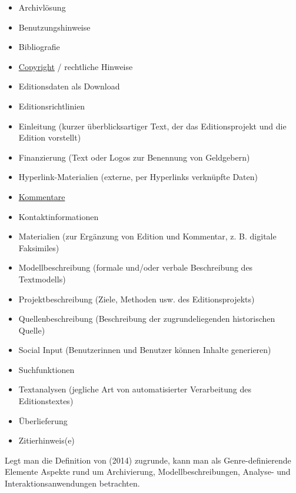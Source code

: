 \documentclass{article}
\begin{document}
        \begin{itemize}\item {Archivlösung}\item {Benutzungshinweise}\item {Bibliografie}\item {\href{http://gams.uni-graz.at/o:konde.44}{Copyright} / rechtliche Hinweise}\item {Editionsdaten als Download}\item {Editionsrichtlinien}\item {Einleitung (kurzer überblicksartiger Text, der das Editionsprojekt und die Edition vorstellt)}\item {Finanzierung (Text oder Logos zur Benennung von Geldgebern)}\item {Hyperlink-Materialien (externe, per Hyperlinks verknüpfte Daten)}\item {\href{http://gams.uni-graz.at/o:konde.34}{Kommentare}}\item {Kontaktinformationen}\item {Materialien (zur Ergänzung von Edition und Kommentar, z. B. digitale Faksimiles)}\item {Modellbeschreibung (formale und/oder verbale Beschreibung des Textmodells)}\item {Projektbeschreibung (Ziele, Methoden usw. des Editionsprojekts)}\item {Quellenbeschreibung (Beschreibung der zugrundeliegenden historischen Quelle)}\item {Social Input (Benutzerinnen und Benutzer können Inhalte generieren)}\item {Suchfunktionen}\item {Textanalysen (jegliche Art von automatisierter Verarbeitung des Editionstextes)}\item {Überlieferung}\item {Zitierhinweis(e)}\end{itemize}Legt man die Definition von (2014) zugrunde, kann man als Genre-definierende Elemente Aspekte rund um Archivierung, Modellbeschreibungen, Analyse- und Interaktionsanwendungen betrachten.\\
            
\end{document}
